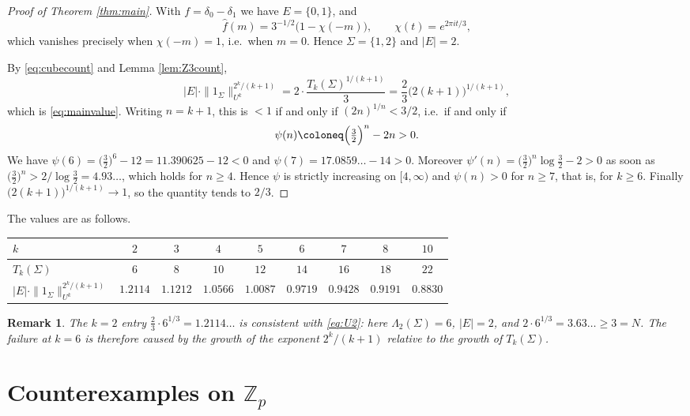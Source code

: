 \documentclass[12pt]{amsart}
\newcommand{\Z}{\mathbb{Z}}
\newtheorem{remark}[theorem]{Remark}
\begin{document}
\begin{proof}[Proof of Theorem \ref{thm:main}]
With $f=\delta_0-\delta_1$ we have $E=\{0,1\}$, and
\[
\hat f(m)=3^{-1/2}\bigl(1-\chi(-m)\bigr),\qquad \chi(t)=e^{2\pi i t/3},
\]
which vanishes precisely when $\chi(-m)=1$, i.e.\ when $m=0$. Hence $\Sigma=\{1,2\}$ and $|E|=2$.

By \eqref{eq:cubecount} and Lemma \ref{lem:Z3count},
\[
|E|\cdot\|1_\Sigma\|_{U^k}^{2^k/(k+1)}
=2\cdot\frac{T_k(\Sigma)^{1/(k+1)}}{3}
=\frac23\bigl(2(k+1)\bigr)^{1/(k+1)},
\]
which is \eqref{eq:mainvalue}. Writing $n=k+1$, this is $<1$ if and only if $(2n)^{1/n}<3/2$, i.e.\ if and only if
\[
\psi(n)\coloneq\Bigl(\tfrac32\Bigr)^{n}-2n>0 .
\]
We have $\psi(6)=\bigl(\tfrac32\bigr)^{6}-12=11.390625-12<0$ and $\psi(7)=17.0859\ldots-14>0$. Moreover $\psi'(n)=\bigl(\tfrac32\bigr)^n\log\tfrac32-2>0$ as soon as $\bigl(\tfrac32\bigr)^n>2/\log\tfrac32=4.93\ldots$, which holds for $n\ge4$. Hence $\psi$ is strictly increasing on $[4,\infty)$ and $\psi(n)>0$ for $n\ge7$, that is, for $k\ge6$. Finally $\bigl(2(k+1)\bigr)^{1/(k+1)}\to1$, so the quantity tends to $2/3$.
\end{proof}

The values are as follows.

\begin{center}
\begin{tabular}{lcccccccc}
\toprule
$k$ & $2$ & $3$ & $4$ & $5$ & $6$ & $7$ & $8$ & $10$\\
\midrule
$T_k(\Sigma)$ & $6$ & $8$ & $10$ & $12$ & $14$ & $16$ & $18$ & $22$\\
$|E|\cdot\|1_\Sigma\|_{U^k}^{2^k/(k+1)}$
 & $1.2114$ & $1.1212$ & $1.0566$ & $1.0087$ & $\mathbf{0.9719}$ & $\mathbf{0.9428}$ & $\mathbf{0.9191}$ & $\mathbf{0.8830}$\\
\bottomrule
\end{tabular}
\end{center}

\begin{remark}
The $k=2$ entry $\tfrac23\cdot6^{1/3}=1.2114\ldots$ is consistent with \eqref{eq:U2}: here $\Lambda_2(\Sigma)=6$, $|E|=2$, and $2\cdot 6^{1/3}=3.63\ldots\ge 3=N$. The failure at $k=6$ is therefore caused by the growth of the exponent $2^k/(k+1)$ relative to the growth of $T_k(\Sigma)$.
\end{remark}

\section{Counterexamples on $\Z_p$}\label{sec:mechanism}
\end{document}
